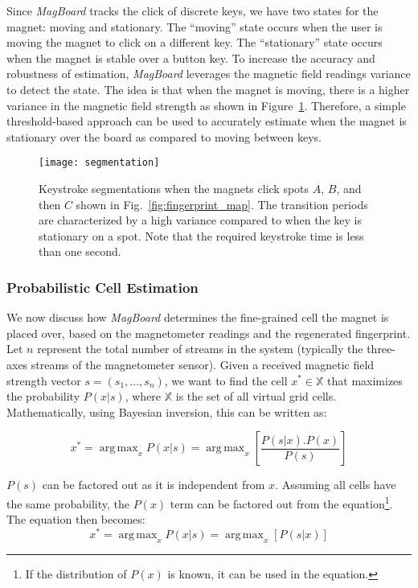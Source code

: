 \documentclass[conference]{IEEEtran}
\DeclareMathOperator*{\argmax}{arg\,max}
\def \sys {\textit{MagBoard}}
\begin{document}
Since \sys{} tracks the click of discrete keys, we have two states for the magnet: moving and stationary. The ``moving'' state occurs when the user is moving the magnet to click on a different key. The ``stationary'' state occurs when the magnet is stable over a button key. To increase the accuracy and robustness of estimation, \sys{} leverages the magnetic field readings variance to detect the state. The idea is that when the magnet is moving, there is a higher variance in the magnetic field strength as shown in Figure~\ref{fig:segmintation}. Therefore, a simple threshold-based approach can be used to accurately estimate when the magnet is stationary over the board as compared to moving between keys. 

\begin{figure}[!t]
\centering
\texttt{[image: segmentation]}
\caption{Keystroke segmentations when the magnets click spots $A$, $B$, and then $C$ shown in Fig.~\ref{fig:fingerprint_map}. The transition periods are characterized by a high variance compared to when the key is stationary on a spot. Note that the required keystroke time is less than one second. } 
\label{fig:segmintation}
\vspace{-0.2in}
\end{figure}

\subsubsection{Probabilistic Cell Estimation}
We now discuss how \sys{} determines the fine-grained cell the magnet is placed over, based on the magnetometer readings and the regenerated fingerprint. 
Let $n$ represent the total number of streams in the system (typically the three-axes streams of the magnetometer sensor).  Given a received magnetic field strength vector $s = (s_1,...,s_n)$, we want to find the cell $x^* \in \mathbb{X}$ that maximizes the probability $P(x|s)$, where $\mathbb{X}$ is the set of all virtual grid cells. Mathematically, using Bayesian inversion, this can be written as:

\begin{equation}
x^* = \argmax_x P(x|s) = \argmax_x [\frac{P(s|x).P(x)}{P(s)}]
\label{equ:bayesian_inversion}
\end{equation}

$P(s)$ can be factored out as it is independent from $x$. Assuming all cells have the same probability, the $P(x)$ term can be factored out from the equation\footnote{If the distribution of $P(x)$ is known, it can be used in the equation.}. The equation then becomes:
\begin{equation}
x^* = \argmax_x P(x|s) = \argmax_x [P(s|x)]
\end{equation}
\end{document}
